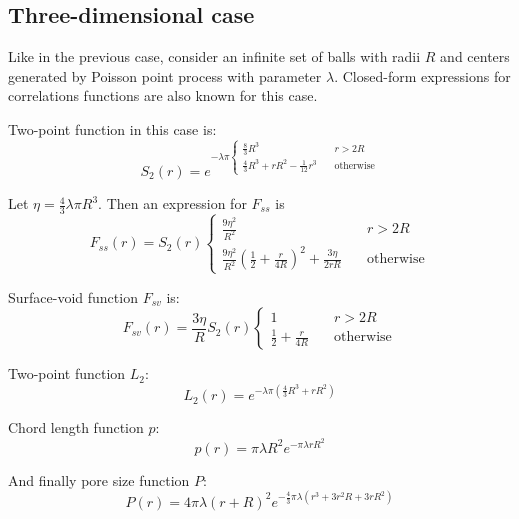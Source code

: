 \documentclass[reprint,amsmath,amssymb,aps,pre,showkeys,showpacs,nofootinbib]{revtex4-1}
\begin{document}
\subsection{Three-dimensional case}
Like in the previous case, consider an infinite set of balls with radii $R$ and
centers generated by Poisson point process with parameter $\lambda$. Closed-form
expressions for correlations functions are also known for this case.

Two-point function in this case is:
\begin{equation*}
  S_2(r) = e^{-\lambda\pi \left\{
  \begin{array}{ll}
    \frac{8}{3} R^3 & \quad r > 2R \\
    \frac{4}{3} R^3 + rR^2 - \frac{1}{12}r^3 & \quad \text{otherwise}
  \end{array}
  \right.}
\end{equation*}

Let $\eta = \frac{4}{3}\lambda \pi R^3$. Then an expression for $F_{ss}$ is
\begin{equation*}
  F_{ss}(r) = S_2(r) \left\{
  \begin{array}{ll}
    \frac{9\eta^2}{R^2} & \quad r > 2R \\
    \frac{9\eta^2}{R^2}(\frac{1}{2}+\frac{r}{4R})^2 + \frac{3\eta}{2rR} & \quad \text{otherwise}
  \end{array}
  \right.
\end{equation*}

Surface-void function $F_{sv}$ is:
\begin{equation*}
  F_{sv}(r) = \frac{3\eta}{R} S_2(r) \left\{
  \begin{array}{ll}
    1 & \quad r > 2R \\
    \frac{1}{2} + \frac{r}{4R} & \quad \text{otherwise}
  \end{array}
  \right.
\end{equation*}

Two-point function $L_2$:
\begin{equation*}
  L_2(r) = e^{-\lambda\pi (\frac{4}{3}R^3 + rR^2)}
\end{equation*}

Chord length function $p$:
\begin{equation*}
  p(r) = \pi\lambda R^2 e^{-\pi\lambda rR^2}
\end{equation*}

And finally pore size function $P$:
\begin{equation*}
  P(r) = 4\pi\lambda(r+R)^2 e^{-\frac{4}{3}\pi\lambda (r^3 + 3r^2R + 3rR^2)}
\end{equation*}
\end{document}
